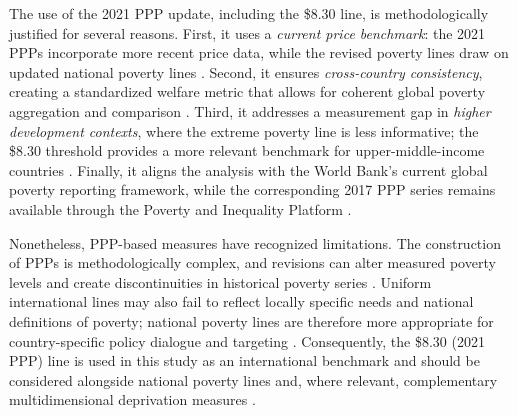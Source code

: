 \documentclass[12pt,a4paper]{article}
\begin{document}
The use of the 2021 PPP update, including the \$8.30 line, is methodologically justified for several reasons. First, it uses a \emph{current price benchmark}: the 2021 PPPs incorporate more recent price data, while the revised poverty lines draw on updated national poverty lines \citep{Foster2025GlobalPoverty}. Second, it ensures \emph{cross-country consistency}, creating a standardized welfare metric that allows for coherent global poverty aggregation and comparison \citep{Foster2025GlobalPoverty}. Third, it addresses a measurement gap in \emph{higher development contexts}, where the extreme poverty line is less informative; the \$8.30 threshold provides a more relevant benchmark for upper-middle-income countries \citep{WorldBank2025GlobalPovertyLines}. Finally, it aligns the analysis with the World Bank's current global poverty reporting framework, while the corresponding 2017 PPP series remains available through the Poverty and Inequality Platform \citep{WorldBank2025GlobalPovertyLines}.

Nonetheless, PPP-based measures have recognized limitations. The construction of PPPs is methodologically complex, and revisions can alter measured poverty levels and create discontinuities in historical poverty series \citep{Deaton2010,Foster2025GlobalPoverty}. Uniform international lines may also fail to reflect locally specific needs and national definitions of poverty; national poverty lines are therefore more appropriate for country-specific policy dialogue and targeting \citep{WorldBank2025GlobalPovertyLines}. Consequently, the \$8.30 (2021 PPP) line is used in this study as an international benchmark and should be considered alongside national poverty lines and, where relevant, complementary multidimensional deprivation measures \citep{WorldBank2025GlobalPovertyLines,Alkire2011}.
\end{document}
